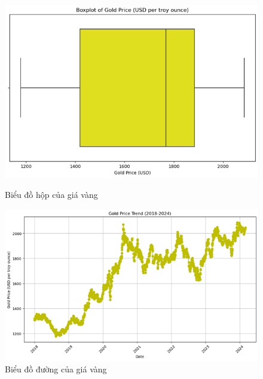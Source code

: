 \documentclass[conference]{IEEEtran}
\begin{document}
\begin{figure}[H]
    \centering
    \begin{minipage}{0.23\textwidth}
    \centering
    \includegraphics[width=1\textwidth]{bibliography/Figure/boxplot_gold.png}
    \caption{Biểu đồ hộp của giá vàng}
    \label{fig:1}
    \end{minipage}
    \hfill
    \begin{minipage}{0.23\textwidth}
    \centering
    \includegraphics[width=1\textwidth]{bibliography/Figure/line_gold.png}
    \caption{Biểu đồ đường của giá vàng}
    \label{fig:2}
    \end{minipage}
\end{figure}
\end{document}
